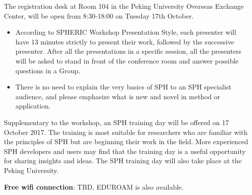 

\newpage
{}
{}
The registration desk at Room 104 in the Peking University Overseas Exchange Center, will be open from 8:30‐18:00 on Tuesday 17th October.

{}
\begin{itemize}
\item According to SPHERIC Workshop Presentation Style, each presenter will have 13 minutes strictly to present their work, followed by the successive presenter.  After all the presentations in a specific session, all the presenters will be asked to stand in front of the conference room and answer possible questions in a Group.
\item There is no need to explain the very basics of SPH to an SPH specialist audience, and please emphasize what is new and novel in method or application.
\end{itemize}

{}

Supplementary to the workshop, an SPH training day will be offered on 17 October 2017. The training is most suitable for researchers who are familiar with the principles of SPH but are beginning their work in the field. More experienced SPH developers and users may find that the training day is a useful opportunity for sharing insights and ideas. The SPH training day will also take place at the Peking University.

{}
\textbf{Free wifi connection}: TBD, EDUROAM is also available.

